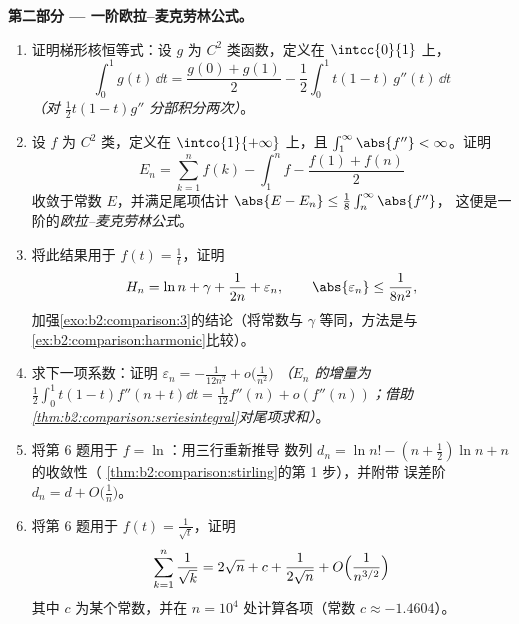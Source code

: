\begin{problem}
\medskip
\noindent\textbf{第二部分 --- 一阶欧拉–麦克劳林公式。}
\begin{enumerate}[resume]
  \item 证明梯形核恒等式：设 $g$ 为
        $C^2$ 类函数，定义在 $\intcc{0}{1}$ 上，
        \[
        \int_0^1 g(t)\,\dd t = \frac{g(0) + g(1)}{2}
        - \frac12\int_0^1 t(1 - t)\,g''(t)\,\dd t
        \]
        \emph{（对 $\frac12 t(1-t)g''$ 分部积分两次）}。
  \item 设 $f$ 为 $C^2$ 类，定义在 $\intco{1}{+\infty}$ 上，且
        $\int_1^\infty \abs{f''} < \infty$。证明
        \[
        E_n = \sum_{k=1}^{n} f(k) - \int_1^n f -
        \frac{f(1) + f(n)}{2}
        \]
        收敛于常数 $E$，并满足尾项估计
        $\abs{E - E_n} \leq \frac18\int_n^\infty\abs{f''}$，
        这便是一阶的\emph{欧拉–麦克劳林公式}。
  \item 将此结果用于 $f(t) = \frac1t$，证明
        \[
        H_n = \ln n + \gamma + \frac{1}{2n} + \varepsilon_n,
        \qquad \abs{\varepsilon_n} \leq \frac{1}{8n^2},
        \]
        加强\cref{exo:b2:comparison:3}的结论（将常数与
        $\gamma$ 等同，方法是与
        \cref{ex:b2:comparison:harmonic}比较）。
  \item 求下一项系数：证明 $\varepsilon_n =
        -\frac{1}{12n^2} + o\bigl(\frac1{n^2}\bigr)$
        \emph{（$E_n$ 的增量为
        $\frac12\int_0^1t(1-t)f''(n+t)\dd t =
        \frac1{12}f''(n) + o(f''(n))$；借助
        \cref{thm:b2:comparison:seriesintegral}对尾项求和）}。
  \item 将第 6 题用于 $f = \ln$：用三行重新推导
        数列 $d_n = \ln n! - (n +
        \frac12)\ln n + n$ 的收敛性（
        \cref{thm:b2:comparison:stirling}的第 1 步），并附带
        误差阶 $d_n = d + O\bigl(\frac1n\bigr)$。
  \item 将第 6 题用于 $f(t) = \frac{1}{\sqrt t}$，证明
        \[
        \sum_{k=1}^{n}\frac1{\sqrt k} = 2\sqrt n + c +
        \frac{1}{2\sqrt n} + O\Bigl(\frac{1}{n^{3/2}}\Bigr)
        \]
        其中 $c$ 为某个常数，并在 $n =
        10^4$ 处计算各项（常数 $c \approx -1.4604$）。
\end{enumerate}


\end{problem}

